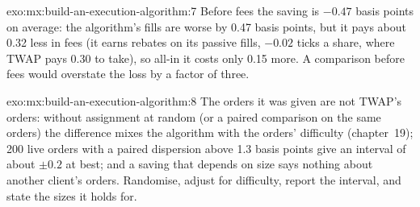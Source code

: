 \begin{solution}{exo:mx:build-an-execution-algorithm:7}
Before fees the saving is $-0.47$ basis points on average: the algorithm's fills are worse by 0.47 basis points, but it pays about 0.32 less in fees
(it earns rebates on its passive fills, $-0.02$ ticks a share, where TWAP pays 0.30 to take), so all-in it costs only 0.15 more. A comparison before
fees would overstate the loss by a factor of three.
\end{solution}

\begin{solution}{exo:mx:build-an-execution-algorithm:8}
The orders it was given are not TWAP's orders: without assignment at random (or a paired comparison on the same orders) the difference mixes the
algorithm with the orders' difficulty (chapter~19); 200 live orders with a paired dispersion above 1.3 basis points give an interval of about $\pm0.2$ at
best; and a saving that depends on size says nothing about another client's orders. Randomise, adjust for difficulty, report the interval, and state
the sizes it holds for.
\end{solution}

